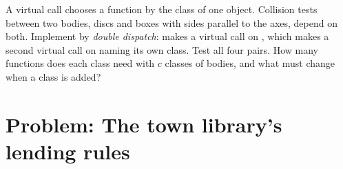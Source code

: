 \begin{exercise}[$\star\star\star$]\label{exo:b2:cpp-polymorphism:12}
A virtual call chooses a function by the class of one object. Collision tests between two bodies, discs and boxes
with sides parallel to the axes, depend on both. Implement  by \emph{double
dispatch}:  makes a virtual call on , which makes a second virtual call on  naming
its own class. Test all four pairs. How many functions does each class need with $c$ classes of bodies, and what
must change when a class is added?
\end{exercise}

\section{Problem: The town library's lending rules}\label{sec:b2:cpp-polymorphism:problem}

